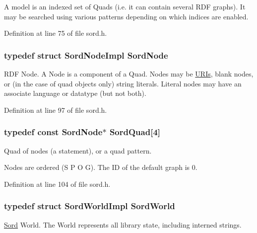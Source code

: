 A model is an indexed set of Quads (i.\+e. it can contain several R\+DF graphs). It may be searched using various patterns depending on which indices are enabled. 

Definition at line 75 of file sord.\+h.

\subsubsection[{\texorpdfstring{Sord\+Node}{SordNode}}]{\setlength{\rightskip}{0pt plus 5cm}typedef struct {\bf Sord\+Node\+Impl} {\bf Sord\+Node}}\hypertarget{group__sord_ga804ac7d56d9fdea50f2d1e7278b1f82b}{}\label{group__sord_ga804ac7d56d9fdea50f2d1e7278b1f82b}
R\+DF Node. A Node is a component of a Quad. Nodes may be \hyperlink{struct_u_r_is}{U\+R\+Is}, blank nodes, or (in the case of quad objects only) string literals. Literal nodes may have an associate language or datatype (but not both). 

Definition at line 97 of file sord.\+h.

\subsubsection[{\texorpdfstring{Sord\+Quad}{SordQuad}}]{\setlength{\rightskip}{0pt plus 5cm}typedef {\bf const} {\bf Sord\+Node}$\ast$ Sord\+Quad\mbox{[}4\mbox{]}}\hypertarget{group__sord_gac79773a042527877d00158c75a41bab2}{}\label{group__sord_gac79773a042527877d00158c75a41bab2}
Quad of nodes (a statement), or a quad pattern.

Nodes are ordered (S P O G). The ID of the default graph is 0. 

Definition at line 104 of file sord.\+h.

\subsubsection[{\texorpdfstring{Sord\+World}{SordWorld}}]{\setlength{\rightskip}{0pt plus 5cm}typedef struct {\bf Sord\+World\+Impl} {\bf Sord\+World}}\hypertarget{group__sord_ga133d918ec58f829198b2cf65f250ed69}{}\label{group__sord_ga133d918ec58f829198b2cf65f250ed69}
\hyperlink{namespace_sord}{Sord} World. The World represents all library state, including interned strings. 

